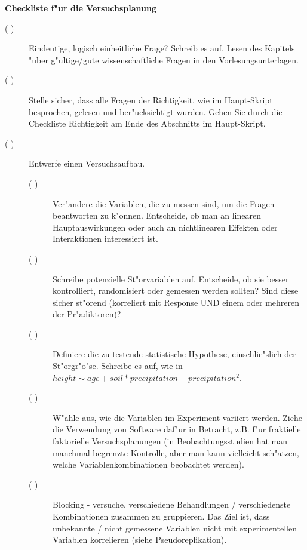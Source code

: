 \documentclass[a4paper,twoside]{tufte-book}\usepackage[]{graphicx}\usepackage[]{color}
\begin{document}
\newpage
\begin{mdframed}
    
\textbf{Checkliste f"ur die Versuchsplanung}

\begin{description}

\item[( )] Eindeutige, logisch einheitliche Frage? Schreib es auf. Lesen des Kapitels "uber g"ultige/gute wissenschaftliche Fragen in den Vorlesungsunterlagen.

\item[( )] Stelle sicher, dass alle Fragen der Richtigkeit, wie im Haupt-Skript besprochen, gelesen und ber"ucksichtigt wurden. Gehen Sie durch die Checkliste Richtigkeit am Ende des Abschnitts im Haupt-Skript.

\item[( )] Entwerfe einen Versuchsaufbau.

  \begin{description}

  \item[( )] Ver"andere die Variablen, die zu messen sind, um die Fragen beantworten zu k"onnen. Entscheide, ob man an linearen Hauptauswirkungen oder auch an nichtlinearen Effekten oder Interaktionen interessiert ist.
  
  \item[( )] Schreibe potenzielle St"orvariablen auf. Entscheide, ob sie besser kontrolliert, randomisiert oder gemessen werden sollten? Sind diese sicher st"orend (korreliert mit Response UND einem oder mehreren der Pr"adiktoren)?
  
  \item[( )] Definiere die zu testende statistische Hypothese, einschlie"slich der St"orgr"o"se. Schreibe es auf, wie in $height  \sim age + soil * precipitation + precipitation^2$. 
  
  \item[( )] W"ahle aus, wie die Variablen im Experiment variiert werden. Ziehe die Verwendung von Software daf"ur in Betracht, z.B. f"ur fraktielle faktorielle Versuchsplanungen (in Beobachtungsstudien hat man manchmal begrenzte Kontrolle, aber man kann vielleicht sch"atzen, welche Variablenkombinationen beobachtet werden).
  
  \item[( )] Blocking - versuche, verschiedene Behandlungen / verschiedenste Kombinationen zusammen zu gruppieren. Das Ziel ist, dass unbekannte / nicht gemessene Variablen nicht mit experimentellen Variablen korrelieren (siehe Pseudoreplikation).
  

\end{description}
\end{description}
\end{mdframed}
\end{document}
